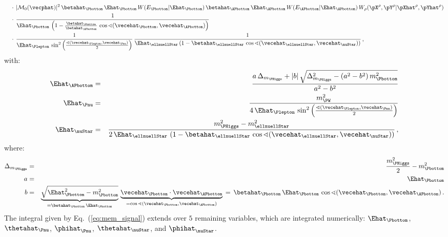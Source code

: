 \begin{align}
 & \quad \cdot \, \vert \mathcal{M}_{0}(\vecphat) \vert^{2} \, 
\betahat_{\Pbottom} \, \Ehat_{\Pbottom} \, W(E_{\Pbottom}|\Ehat_{\Pbottom}) \, 
\betahat_{\APbottom} \, \Ehat_{\APbottom} \, W(E_{\APbottom}|\Ehat_{\APbottom}) \,
W_{\rho}( \pX^{\rho},\pY^{\rho} | \pXhat^{\rho},\pYhat^{\rho} ) \nonumber \\
 & \quad \cdot \, \frac{1}{\Ehat_{\Pbottom} \, \left( 1 - \frac{\betahat_{\Pbottom}}{\betahat_{\APbottom}} \, \cos\sphericalangle(\vecehat_{\Pbottom},\vecehat_{\APbottom}) \right)} \nonumber \\
 & \quad \cdot \, \frac{1}{\Ehat_{\Plepton} \, \sin^{2}\left(\frac{\sphericalangle(\vecehat_{\Plepton},\vecehat_{\Pnu})}{2}\right)} \,
\frac{1}{\Ehat_{\ellnuellStar} \left( 1 - \betahat_{\ellnuellStar} \, \cos\sphericalangle(\vecehat_{\ellnuellStar},\vecehat_{\nuStar}) \right)} \, ,
\label{eq:mem_signal}
\end{align}
with:
\begin{eqnarray}
\Ehat_{\APbottom} & = & \frac{a \, \Delta_{m_{\PHiggs}} + |b| \, \sqrt{\Delta_{m_{\PHiggs}}^{2} - (a^{2} - b^{2}) \, m_{\Pbottom}^{2}}}{a^{2} - b^{2}} \nonumber \\
\Ehat_{\Pnu} & = & \frac{m_{\PW}^{2}}{4 \, \Ehat_{\Plepton} \, \sin^{2}\left(\frac{\sphericalangle(\vecehat_{\Plepton},\vecehat_{\Pnu})}{2}\right)} \nonumber \\
\Ehat_{\nuStar} & = & \frac{m_{\PHiggs}^{2} - m_{\ellnuellStar}^{2}}{2 \, \Ehat_{\ellnuellStar} \, 
 \left( 1 - \betahat_{\ellnuellStar} \, \cos\sphericalangle(\vecehat_{\ellnuellStar},\vecehat_{\nuStar}) \right)} \, ,
\end{eqnarray}
where:
\begin{eqnarray}
\Delta_{m_{\PHiggs}} & = & \frac{m_{\PHiggs}^{2}}{2} - m_{\Pbottom}^{2} \nonumber \\
a & = & \Ehat_{\Pbottom} \nonumber \\
b & = & \underbrace{\sqrt{\Ehat_{\Pbottom}^{2} - m_{\Pbottom}^{2}}}_{= \betahat_{\Pbottom} \, \Ehat_{\Pbottom}} \, 
 \underbrace{\vecehat_{\Pbottom} \cdot \vecehat_{\APbottom}}_{= \cos\sphericalangle(\vecehat_{\Pbottom},\vecehat_{\APbottom})} \, 
= \, \betahat_{\Pbottom} \, \Ehat_{\Pbottom} \, \cos\sphericalangle(\vecehat_{\Pbottom},\vecehat_{\APbottom}) \, .
\end{eqnarray}
The integral given by Eq.~(\ref{eq:mem_signal}) extends over $5$ remaining variables,
which are integrated numerically: $\Ehat_{\Pbottom}$, $\thetahat_{\Pnu}$, $\phihat_{\Pnu}$, $\thetahat_{\nuStar}$, and $\phihat_{\nuStar}$.

